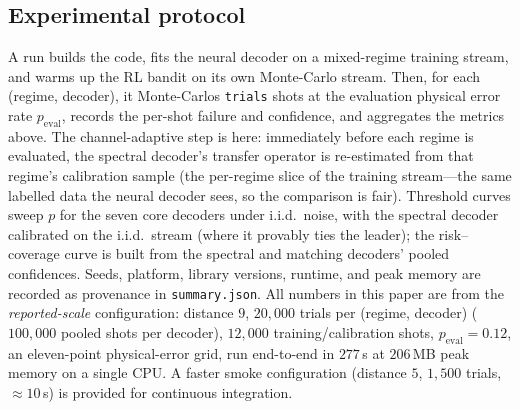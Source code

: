 \documentclass[reprint,aps,prxquantum,amsmath,amssymb,floatfix,nofootinbib,longbibliography]{revtex4-2}
\theoremstyle{definition}
\theoremstyle{remark}
\theoremstyle{plain}
\newcommand{\sync}[1]{#1}
\begin{document}
\subsection{Experimental protocol}
\label{sec:methods_protocol}
A run builds the code, fits the neural decoder on a mixed-regime training stream, and warms up the RL bandit on its own Monte-Carlo stream. Then, for each (regime, decoder), it Monte-Carlos \texttt{trials} shots at the evaluation physical error rate $p_{\mathrm{eval}}$, records the per-shot failure and confidence, and aggregates the metrics above. The channel-adaptive step is here: immediately before each regime is evaluated, the spectral decoder's transfer operator is re-estimated from that regime's calibration sample (the per-regime slice of the training stream---the same labelled data the neural decoder sees, so the comparison is fair). Threshold curves sweep $p$ for the seven core decoders under i.i.d.\ noise, with the spectral decoder calibrated on the i.i.d.\ stream (where it provably ties the leader); the risk--coverage curve is built from the spectral and matching decoders' pooled confidences. Seeds, platform, library versions, runtime, and peak memory are recorded as provenance in \texttt{summary.json}. All numbers in this paper are from the \emph{reported-scale} configuration: distance $\sync{9}$, $\sync{20{,}000}$ trials per (regime, decoder) ($\sync{100{,}000}$ pooled shots per decoder), $\sync{12{,}000}$ training/calibration shots, $p_{\mathrm{eval}}=\sync{0.12}$, an eleven-point physical-error grid, run end-to-end in $\sync{277}$\,s at $\sync{206}$\,MB peak memory on a single CPU. A faster smoke configuration (distance $\sync{5}$, $\sync{1{,}500}$ trials, $\approx\sync{10}$\,s) is provided for continuous integration.
\end{document}

